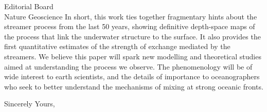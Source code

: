 \documentclass[jmkletter]{scrlttr2}
\begin{document}
\begin{letter}{Editorial Board\\Nature Geoscience
}
In short, this work ties together fragmentary hints about the streamer process from the last 50 years, showing definitive depth-space maps of the process that link the underwater structure to the surface.  It also provides the first quantitative estimates of the strength of exchange mediated by the streamers.  We believe this paper will spark new modelling and theoretical studies aimed at understanding the process we observe. The phenomenology will be of wide interest to earth scientists, and the details of importance to oceanographers who seek to better understand the mechanisms of mixing at strong oceanic fronts. 


    \closing{Sincerely Yours,}
  \end{letter}
 
\end{document}
